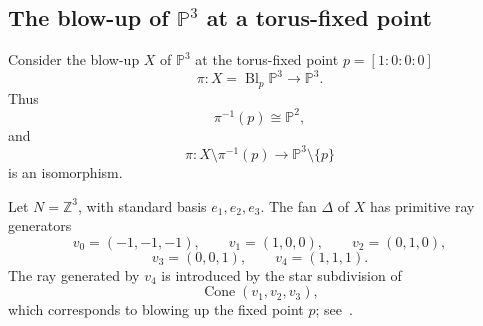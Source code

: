 \documentclass[colorlinks,11pt,reqno]{amsart}
\theoremstyle{definition}
\theoremstyle{remark}
\numberwithin{equation}{section}
\numberwithin{equation}{section}
\newcommand{\Z}{\mathbb{Z}}
\begin{document}
\subsection{The blow-up of \(\mathbb P^3\) at a torus-fixed point}\label{subsec:blowup-P3}

Consider the blow-up $X$ of $\mathbb{P}^3$ at the torus-fixed point $p=[1:0:0:0]$
\[
\pi \colon X = \operatorname{Bl}_{p}\mathbb P^3 \longrightarrow\mathbb P^3.
\]
Thus
\[
\pi^{-1}(p)\cong\mathbb P^2,
\]
and
\[
\pi \colon  X\setminus\pi^{-1}(p) \longrightarrow \mathbb P^3\setminus\{p\}
\]
is an isomorphism.

Let \(N=\Z^3\), with standard basis \(e_1,e_2,e_3\). The fan \(\Delta\) of \(X\) has primitive ray generators
\[
v_0=(-1,-1,-1),\qquad v_1=(1,0,0),\qquad v_2=(0,1,0),
\]
\[
v_3=(0,0,1),\qquad v_4=(1,1,1).
\]
The ray generated by \(v_4\) is introduced by the star subdivision of
\[
\operatorname{Cone}(v_1,v_2,v_3),
\]
which corresponds to blowing up the fixed point \(p\); see~\cite{Cox, Fulton}.
\end{document}
